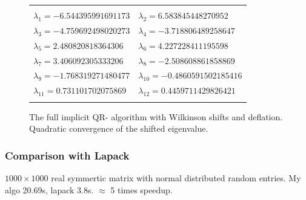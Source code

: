 \begin{figure}
\begin{center}
	\begin{scriptsize}
	\begin{tabular}{ll}
		\hline
		\hline
		\\
		$\lambda_1=
		-6.544395991691173
		$ & $\lambda_2=
		6.583845448270952
		$ \\ $\lambda_3=
		-4.759692498020273
		$ & $\lambda_4=
		-3.718806489258647
		$ \\ $\lambda_5=
		2.480820818364306
		$ & $\lambda_6=
		4.227228411195598
		$ \\ $\lambda_7=
		3.406092305333206
		$ & $\lambda_8=
		-2.508608861858869
		$ \\ $\lambda_9=
		-1.768319271480477
		$ & $\lambda_{10}=
		-0.4860591502185416
		$ \\ $\lambda_{11}=
		0.731101702075869
		$ & $\lambda_{12}=
		0.4459711429826421
		$ \\
		\\
		\hline
		\hline
	\end{tabular}
	\end{scriptsize}
\caption{
	The full implicit QR- algorithm with Wilkinson shifts and deflation. Quadratic convergence
	of the shifted eigenvalue. 
}
\end{center}
\end{figure}%

\subsubsection*{Comparison with Lapack}

$1000\times1000$ real symmertic matrix with normal distributed random entries. 
My algo 20.69s, lapack 3.8s. $\approx$ 5 times speedup.


